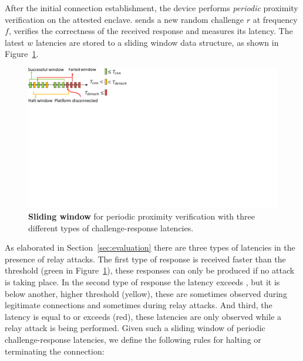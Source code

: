 
After the initial connection establishment, the \device device performs \emph{periodic} proximity verification on the attested enclave. \device sends a new random challenge $r$ at frequency $f$, verifies the correctness of the received response and measures its latency. The latest $w$ latencies are stored to a sliding window data structure, as shown in Figure~\ref{fig:slidingWindow}.

\begin{figure}[t]
  \centering
   \includegraphics[trim={0 14cm 20cm 0}, clip, width=0.7\linewidth]{chapters/ProximiTEE/figures/SlidingWindow_1.pdf}
    \caption[\name periodic proximity verification]{\textbf{Sliding window} for periodic proximity verification with three different types of challenge-response latencies.}
    \label{fig:slidingWindow}
\end{figure}

As elaborated in Section~\ref{sec:evaluation} there are three types of latencies in the presence of relay attacks. The first type of response is received faster than the  threshold \connect (green in Figure~\ref{fig:slidingWindow}), these responses can only be produced if no attack is taking place. In the second type of response the latency exceeds \connect, but it is below another, higher threshold \detach (yellow), these are sometimes observed during legitimate connections and sometimes during relay attacks. And third, the latency is equal to or exceeds \detach (red), these latencies are only observed while a relay attack is being performed. Given such a sliding window of periodic challenge-response latencies, we define the following rules for halting or terminating the connection:

